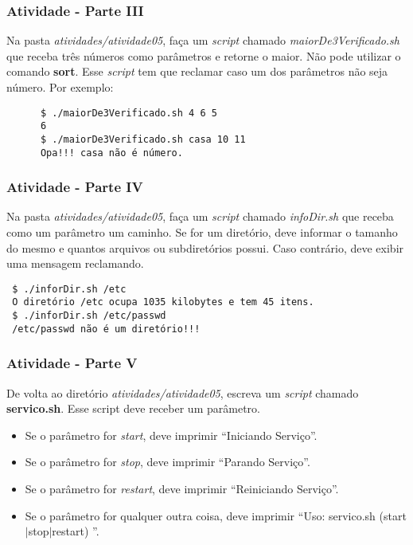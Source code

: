 \documentclass{beamer}
\begin{document}
   \begin{frame}[fragile]
      \frametitle{Atividade - Parte III}
      Na pasta \textit{atividades/atividade05}, faça um \textit{script} chamado \textit{maiorDe3Verificado.sh} que receba três números como parâmetros e retorne o maior. Não pode utilizar o comando \textbf{sort}. Esse \textit{script} tem que reclamar caso um dos parâmetros não seja número.
      Por exemplo: 
      \begin{verbatim}
      $ ./maiorDe3Verificado.sh 4 6 5
      6
      $ ./maiorDe3Verificado.sh casa 10 11
      Opa!!! casa não é número.
      \end{verbatim}
\end{frame}

   \begin{frame}[fragile]
      \frametitle{Atividade - Parte IV}
      Na pasta \textit{atividades/atividade05}, faça um \textit{script} chamado \textit{infoDir.sh} que receba como um parâmetro um caminho. Se for um diretório, deve informar o tamanho do mesmo e quantos arquivos ou subdiretórios possui. Caso contrário, deve exibir uma mensagem reclamando.
      \begin{verbatim}
 $ ./inforDir.sh /etc
 O diretório /etc ocupa 1035 kilobytes e tem 45 itens.
 $ ./inforDir.sh /etc/passwd
 /etc/passwd não é um diretório!!!
      \end{verbatim}
\end{frame}

   \begin{frame}
      \frametitle{Atividade - Parte V}
      De volta ao diretório \textit{atividades/atividade05}, escreva um \textit{script} chamado \textbf{servico.sh}. Esse script deve receber um parâmetro.
      \begin{itemize}
         \item Se o parâmetro for \textit{start}, deve imprimir \textquotedblleft Iniciando Serviço\textquotedblright.
         \item Se o parâmetro for \textit{stop}, deve imprimir \textquotedblleft Parando Serviço\textquotedblright.
         \item Se o parâmetro for \textit{restart}, deve imprimir \textquotedblleft Reiniciando Serviço\textquotedblright.
         \item Se o parâmetro for qualquer outra coisa,  deve imprimir \textquotedblleft Uso: servico.sh (start$|$stop$|$restart) \textquotedblright.
 
      \end{itemize}
   \end{frame}
\end{document}
